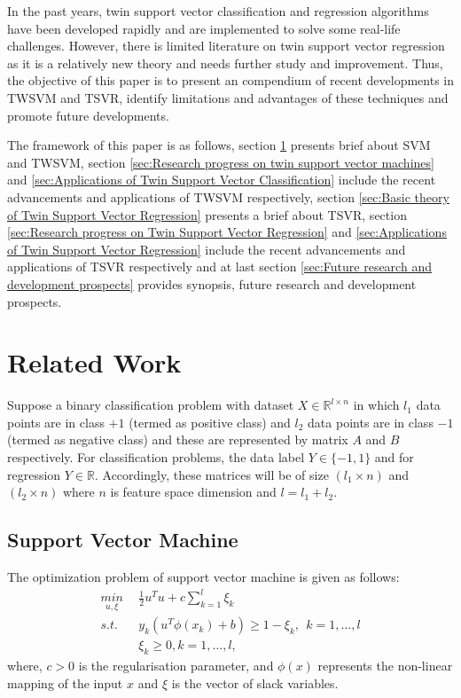 \documentclass[pdflatex,sn-mathphys]{sn-jnl}%
\theoremstyle{thmstyleone}%
\theoremstyle{thmstyletwo}%
\theoremstyle{thmstylethree}%
\begin{document}
In the past years, twin support vector classification and regression algorithms have been developed rapidly and are implemented to solve some real-life challenges. However, there is limited literature on twin support vector regression as it is a relatively new theory and needs further study and improvement. Thus, the objective of this paper is to present an compendium of recent developments in TWSVM and TSVR, identify limitations and advantages of these techniques and promote future developments. 

The framework of this paper is as follows, section \ref{sec:Related Work} presents brief about SVM and TWSVM, section \ref{sec:Research progress on twin support vector machines} and \ref{sec:Applications of Twin Support Vector Classification} include the recent advancements and applications of TWSVM respectively, section \ref{sec:Basic theory of Twin Support Vector Regression} presents a brief about TSVR, section \ref{sec:Research progress on Twin Support Vector Regression} and \ref{sec:Applications of Twin Support Vector Regression} include the recent advancements and applications of TSVR respectively and at last section \ref{sec:Future research and development prospects} provides synopsis, future research and development prospects.

\section{Related Work}
\label{sec:Related Work}
Suppose a binary classification problem with dataset $X \in \mathbb{R}^{l\times n}$  in which $l_1$ data points are in class $+1$ (termed as positive class) and $l_2$ data points are in class $-1$ (termed as negative class) and these are represented by matrix $A$ and $B$ respectively. For classification problems, the data label $Y\in\{-1,1\}$ and for regression $Y\in \mathbb{R}$. Accordingly, these matrices will be of size $(l_1 \times n)$ and $(l_2 \times n)$  where $n$ is feature space dimension and $l=l_1+l_2.$

\subsection{Support Vector Machine \cite{cortes1995support}}
The optimization problem of support vector machine is given as follows:
\begin{align}
\label{eqn:SVM}
    \underset{u,\xi}{min}~~&\frac{1}{2}u^Tu+c\sum_{k=1}^l \xi_k \nonumber \\
    s.t.~~ &y_k(u^T\phi(x_k)+b)\ge 1-\xi_k, ~~ k=1,\dots,l \nonumber \\
    &\xi_k\ge 0, k=1,\dots,l,
\end{align}
where, $c>0$ is the regularisation parameter, and $\phi(x)$ represents the non-linear mapping of the input $x$ and $\xi$ is the vector of slack variables.
\end{document}
